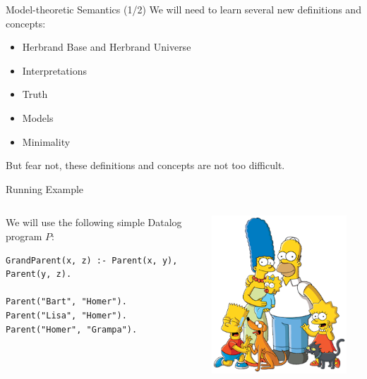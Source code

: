 \begin{frame}{Model-theoretic Semantics (1/2)}
We will need to learn several new definitions and concepts:
\begin{itemize}
    \item Herbrand Base and Herbrand Universe
    \item Interpretations
    \item Truth
    \item Models
    \item Minimality
\end{itemize}

But fear not, these definitions and concepts are not too difficult.
\end{frame}

\begin{frame}[fragile]{Running Example}
\begin{columns}
\begin{column}{.65\textwidth}
We will use the following simple Datalog program $P$:

\medskip

\begin{lstlisting}[language=flix]
GrandParent(x, z) :- Parent(x, y), Parent(y, z).

Parent("Bart", "Homer").
Parent("Lisa", "Homer").
Parent("Homer", "Grampa").
\end{lstlisting}
\end{column}
\begin{column}{.35\textwidth}
\begin{flushright}
\includegraphics[width=0.9\textwidth]{img/simpsons.png}
\end{flushright}
\end{column}
\end{columns}
\end{frame}

